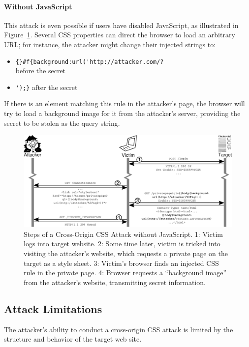 \documentclass{sig-alternate}
\begin{document}
\paragraph{Without JavaScript}
This attack is even possible if users have disabled JavaScript,
as illustrated in Figure~\ref{figure:steps}.  Several CSS
properties can direct the browser to load an arbitrary URL; for
instance, the attacker might change their injected strings to:

\begin{itemize}
\item \verb|{}#f{background:url('http://attacker.com/?|\\
  before the secret
\item \verb|');}| after the secret
\end{itemize}

If there is an element matching this rule in the attacker's page, the
browser will try to load a background image for it from the attacker's
server, providing the secret to be stolen as the query string.

\begin{figure}
\centering
\includegraphics[width=\linewidth]{steps}
\caption{Steps of a Cross-Origin CSS Attack without JavaScript.  1:
  Victim logs into target website.  2: Some time later, victim is
  tricked into visiting the attacker's website, which requests a private
  page on the target as a style sheet.  3: Victim's browser finds an
  injected CSS rule in the private page.  4: Browser requests a
  “background image” from the attacker's website, transmitting secret
  information.}
\label{figure:steps}
\end{figure}

\subsection{Attack Limitations} \label{sec:limits}
The attacker's ability to conduct a cross-origin CSS attack is limited
by the structure and behavior of the target web site.
\end{document}

